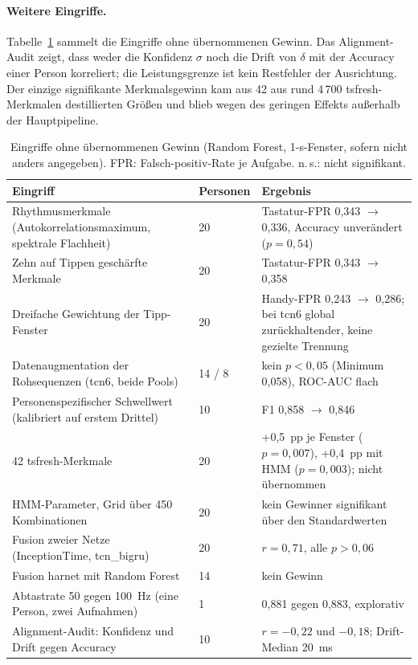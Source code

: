 \paragraph{Weitere Eingriffe.} Tabelle~\ref{tab:null} sammelt die
Eingriffe ohne übernommenen Gewinn. Das Alignment-Audit zeigt, dass weder
die Konfidenz $\sigma$ noch die Drift von $\delta$ mit der Accuracy einer
Person korreliert; die Leistungsgrenze ist kein Restfehler der Ausrichtung.
Der einzige signifikante Merkmalsgewinn kam aus 42 aus rund 4\,700
tsfresh-Merkmalen destillierten Größen und blieb wegen des geringen Effekts
außerhalb der Hauptpipeline.

\begin{table}[H]
  \centering
  \caption{Eingriffe ohne übernommenen Gewinn (Random Forest, 1-s-Fenster,
  sofern nicht anders angegeben). FPR: Falsch-positiv-Rate je Aufgabe.
  n.\,s.: nicht signifikant.}
  \label{tab:null}
  \footnotesize
  \begin{tabular}{p{50mm}lp{72mm}}
    \hline
    \textbf{Eingriff} & \textbf{Personen} & \textbf{Ergebnis} \\ \hline \hline
    Rhythmusmerkmale (Autokorrelationsmaximum, spektrale Flachheit) & 20 & Tastatur-FPR 0,343 $\to$ 0,336, Accuracy unverändert ($p = 0{,}54$) \\
    Zehn auf Tippen geschärfte Merkmale & 20 & Tastatur-FPR 0,343 $\to$ 0,358 \\
    Dreifache Gewichtung der Tipp-Fenster & 20 & Handy-FPR 0,243 $\to$ 0,286; bei tcn6 global zurückhaltender, keine gezielte Trennung \\
    Datenaugmentation der Rohsequenzen (tcn6, beide Pools) & 14 / 8 & kein $p < 0{,}05$ (Minimum 0,058), ROC-AUC flach \\
    Personenspezifischer Schwellwert (kalibriert auf erstem Drittel) & 10 & F1 0,858 $\to$ 0,846 \\
    42 tsfresh-Merkmale & 20 & +0,5~pp je Fenster ($p = 0{,}007$), +0,4~pp mit HMM ($p = 0{,}003$); nicht übernommen \\
    HMM-Parameter, Grid über 450 Kombinationen & 20 & kein Gewinner signifikant über den Standardwerten \\
    Fusion zweier Netze (InceptionTime, tcn\_bigru) & 20 & $r = 0{,}71$, alle $p > 0{,}06$ \\
    Fusion harnet mit Random Forest & 14 & kein Gewinn \\
    Abtastrate 50 gegen 100~Hz (eine Person, zwei Aufnahmen) & 1 & 0,881 gegen 0,883, explorativ \\
    Alignment-Audit: Konfidenz und Drift gegen Accuracy & 10 & $r = -0{,}22$ und $-0{,}18$; Drift-Median 20~ms \\ \hline
  \end{tabular}
\end{table}

